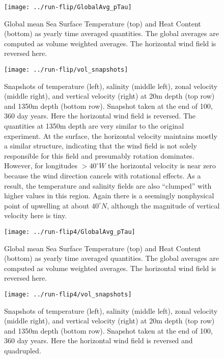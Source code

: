 \documentclass[a4paper,11pt]{article}
\begin{document}

\begin{figure}
\centering
\texttt{[image: ../run-flip/GlobalAvg\_pTau]}
\caption{Global mean Sea Surface Temperature (top) and Heat Content (bottom) as yearly time averaged quantities. The global averages are computed as volume weighted averages. The horizontal wind field is reversed here.}
\label{fig:flipGlobalAvgs}
\end{figure}

\begin{figure}
\centering
\texttt{[image: ../run-flip/vol\_snapshots]}
\caption{Snapshots of temperature (left), salinity (middle left), zonal velocity (middle right), and vertical velocity (right) at 20m depth (top row) and 1350m depth (bottom row). Snapshot taken at the end of 100, 360 day years. Here the horizontal wind field is reversed. The quantities at 1350m depth are very similar to the original experiment. At the surface, the horizontal velocity maintains mostly a similar structure, indicating that the wind field is not solely responsible for this field and presumably rotation dominates. However, for longitudes $>40^{\circ}W$ the horizontal velocity is near zero because the wind direction cancels with rotational effects. As a result, the temperature and salinity fields are also ``clumped'' with higher values in this region. Again there is a seemingly nonphysical point of upwelling at about $40^{\circ}N$, although the magnitude of vertical velocity here is tiny.}
\label{fig:flipVolSnaps}
\end{figure}


\begin{figure}
\centering
\texttt{[image: ../run-flip4/GlobalAvg\_pTau]}
\caption{Global mean Sea Surface Temperature (top) and Heat Content (bottom) as yearly time averaged quantities. The global averages are computed as volume weighted averages. The horizontal wind field is reversed here.}
\label{fig:flipr_GlobalAvgs}
\end{figure}

\begin{figure}
\centering
\texttt{[image: ../run-flip4/vol\_snapshots]}
\caption{Snapshots of temperature (left), salinity (middle left), zonal velocity (middle right), and vertical velocity (right) at 20m depth (top row) and 1350m depth (bottom row). Snapshot taken at the end of 100, 360 day years. Here the horizontal wind field is reversed and quadrupled. }
\label{fig:flip4_olSnaps}
\end{figure}
\end{document}
